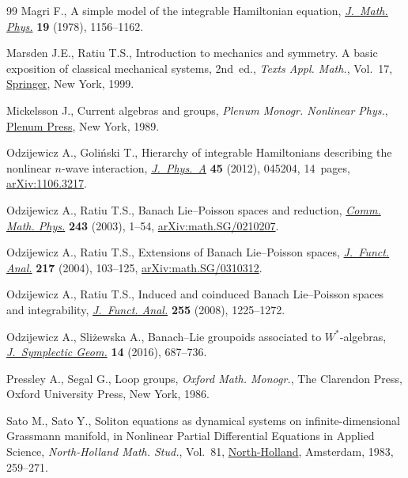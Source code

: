 \documentclass[10pt,a4paper]{amsart}
\theoremstyle{definition}
\numberwithin{equation}{section}
\begin{document}
\begin{thebibliography}{99}
Magri F., A simple model of the integrable {H}amiltonian equation,
 \href{https://doi.org/10.1063/1.523777}{\textit{J.~Math. Phys.}} \textbf{19} (1978), 1156--1162.

Marsden J.E., Ratiu T.S., Introduction to mechanics and symmetry. A basic
 exposition of classical mechanical systems, 2nd~ed., \textit{Texts Appl. Math.},
 Vol.~17, \href{https://doi.org/10.1007/978-0-387-21792-5}{Springer}, New York, 1999.

Mickelsson J., Current algebras and groups, \textit{Plenum Monogr. Nonlinear Phys.},
 \href{https://doi.org/10.1007/978-1-4757-0295-8}{Plenum Press}, New York, 1989.

Odzijewicz A., Goli\'nski T., Hierarchy of integrable {H}amiltonians describing
 the nonlinear {$n$}-wave interaction, \href{https://doi.org/10.1088/1751-8113/45/4/045204}{\textit{J.~Phys.~A}} \textbf{45} (2012),
 045204, 14~pages, \href{https://arxiv.org/abs/1106.3217}{arXiv:1106.3217}.

Odzijewicz A., Ratiu T.S., Banach {L}ie--{P}oisson spaces and reduction,
 \href{https://doi.org/10.1007/s00220-003-0948-8}{\textit{Comm. Math. Phys.}} \textbf{243} (2003), 1--54,
 \href{https://arxiv.org/abs/math.SG/0210207}{arXiv:math.SG/0210207}.

Odzijewicz A., Ratiu T.S., Extensions of {B}anach {L}ie--{P}oisson spaces,
 \href{https://doi.org/10.1016/j.jfa.2004.02.012}{\textit{J.~Funct. Anal.}} \textbf{217} (2004), 103--125,
 \href{https://arxiv.org/abs/math.SG/0310312}{arXiv:math.SG/0310312}.

Odzijewicz A., Ratiu T.S., Induced and coinduced {B}anach {L}ie--{P}oisson
 spaces and integrability, \href{https://doi.org/10.1016/j.jfa.2008.06.001}{\textit{J.~Funct. Anal.}} \textbf{255} (2008),
 1225--1272.

Odzijewicz A., Sli\.{z}ewska A., Banach--{L}ie groupoids associated to
 {$W^*$}-algebras, \href{https://doi.org/10.4310/JSG.2016.v14.n3.a3}{\textit{J.~Symplectic Geom.}} \textbf{14} (2016), 687--736.

Pressley A., Segal G., Loop groups, \textit{Oxford Math. Monogr.}, The Clarendon Press,
 Oxford University Press, New York, 1986.

Sato M., Sato Y., Soliton equations as dynamical systems on
 infinite-dimensional {G}rassmann manifold, in Nonlinear {P}artial
 {D}ifferential {E}quations in {A}pplied {S}cience, \textit{North-Holland
 Math. Stud.}, Vol.~81, \href{https://doi.org/10.1016/S0304-0208(08)72096-6}{North-Holland}, Amsterdam, 1983, 259--271.


\end{thebibliography}
\end{document}
